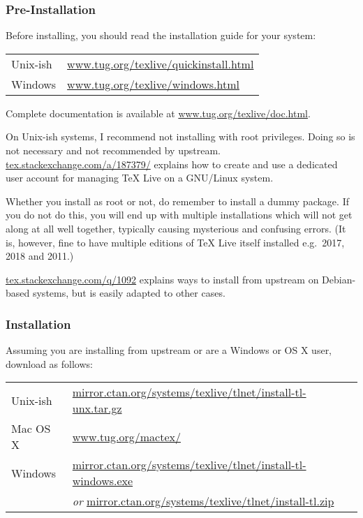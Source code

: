\subsubsection<1-| beamer:0>{Pre-Installation}

Before installing, you should read the installation guide for your system:

\noindent\begin{tabular}{@{}ll@{}}
  Unix-ish & \url{www.tug.org/texlive/quickinstall.html}\\
  Windows & \url{www.tug.org/texlive/windows.html}\\
\end{tabular}

\noindent Complete documentation is available at \url{www.tug.org/texlive/doc.html}.

On Unix-ish systems, I recommend not installing with root privileges.
Doing so is not necessary and not recommended by upstream.
\url{tex.stackexchange.com/a/187379/} explains how to create and use a dedicated user account for managing \TeX{} Live on a GNU/Linux system.

Whether you install as root or not, do remember to install a dummy package.
If you do not do this, you will end up with multiple installations which will not get along at all well together, typically causing mysterious and confusing errors.
(It is, however, fine to have multiple editions of \TeX{} Live itself installed e.g.~2017, 2018 and 2011.)

\url{tex.stackexchange.com/q/1092} explains ways to install from upstream on Debian-based systems, but is easily adapted to other cases. 

\subsubsection<1-| beamer:0>{Installation}

Assuming you are installing from upstream or are a Windows or OS X user, download as follows:

\noindent\begin{tabular}{@{}ll@{}}
  Unix-ish  & \url{mirror.ctan.org/systems/texlive/tlnet/install-tl-unx.tar.gz}\\
  Mac OS X &  \url{www.tug.org/mactex/}\\
  Windows & \url{mirror.ctan.org/systems/texlive/tlnet/install-tl-windows.exe}\\
  & \emph{or} \url{mirror.ctan.org/systems/texlive/tlnet/install-tl.zip}\\
\end{tabular}

